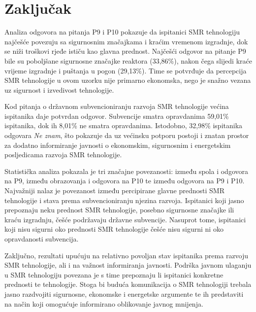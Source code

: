 \section{Zaključak}

Analiza odgovora na pitanja P9 i P10 pokazuje da ispitanici SMR tehnologiju najčešće povezuju sa sigurnosnim značajkama i kraćim vremenom izgradnje, dok se niži troškovi rjeđe ističu kao glavna prednost. Najčešći odgovor na pitanje P9 bile su poboljšane sigurnosne značajke reaktora (33,86\%), nakon čega slijedi kraće vrijeme izgradnje i puštanja u pogon (29,13\%). Time se potvrđuje da percepcija SMR tehnologije u ovom uzorku nije primarno ekonomska, nego je snažno vezana uz sigurnost i izvedivost tehnologije.

Kod pitanja o državnom subvencioniranju razvoja SMR tehnologije većina ispitanika daje potvrdan odgovor. Subvencije smatra opravdanima 59,01\% ispitanika, dok ih 8,01\% ne smatra opravdanima. Istodobno, 32,98\% ispitanika odgovara \textit{Ne znam}, što pokazuje da uz većinsku potporu postoji i znatan prostor za dodatno informiranje javnosti o ekonomskim, sigurnosnim i energetskim posljedicama razvoja SMR tehnologije.

Statistička analiza pokazala je tri značajne povezanosti: između spola i odgovora na P9, između obrazovanja i odgovora na P10 te između odgovora na P9 i P10. Najvažniji nalaz je povezanost između percipirane glavne prednosti SMR tehnologije i stava prema subvencioniranju njezina razvoja. Ispitanici koji jasno prepoznaju neku prednost SMR tehnologije, posebno sigurnosne značajke ili kraću izgradnju, češće podržavaju državne subvencije. Nasuprot tome, ispitanici koji nisu sigurni oko prednosti SMR tehnologije češće nisu sigurni ni oko opravdanosti subvencija.

Zaključno, rezultati upućuju na relativno povoljan stav ispitanika prema razvoju SMR tehnologije, ali i na važnost informiranja javnosti. Podrška javnom ulaganju u SMR tehnologiju povezana je s time prepoznaju li ispitanici konkretne prednosti te tehnologije. Stoga bi buduća komunikacija o SMR tehnologiji trebala jasno razdvojiti sigurnosne, ekonomske i energetske argumente te ih predstaviti na način koji omogućuje informirano oblikovanje javnog mnijenja.
